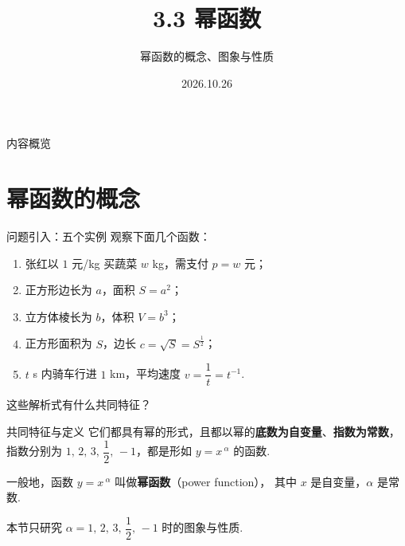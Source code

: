 \documentclass[aspectratio=169,13pt,t] {beamer}
\title[3.3幂函数]{3.3 幂函数}
\subtitle{幂函数的概念、图象与性质}
\author[好好学习，努力向上]{}
\institute{}
\date{2026.10.26}
\theoremstyle{definition}
\begin{document}
\begin{frame}{}
	\titlepage
\end{frame}

\begin{frame}{内容概览}
	\tableofcontents
\end{frame}

\section{幂函数的概念}

\begin{frame}{问题引入：五个实例}
	观察下面几个函数：
	\begin{enumerate}[(1)]
		\item 张红以 $1$ 元/kg 买蔬菜 $w$ kg，需支付 $p=w$ 元；
		\item 正方形边长为 $a$，面积 $S=a^{2}$；
		\item 立方体棱长为 $b$，体积 $V=b^{3}$；
		\item 正方形面积为 $S$，边长 $c=\sqrt{S}=S^{\frac12}$；
		\item $t$ s 内骑车行进 $1$ km，平均速度 $v=\dfrac{1}{t}=t^{-1}$.
	\end{enumerate}
	\vspace{-1em}
	\begin{summarybox}[观察]
		这些解析式有什么共同特征？
	\end{summarybox}
\end{frame}

\begin{frame}{共同特征与定义}
	它们都具有幂的形式，且都以幂的\textbf{底数为自变量}、\textbf{指数为常数}，
	指数分别为 $1,\,2,\,3,\,\dfrac12,\,-1$，都是形如 $y=x\,^{\alpha}$ 的函数.
	\vspace{-1em}
	\begin{summarybox}[幂函数的定义]
		一般地，函数 \textbf{$y=x\,^{\alpha}$} 叫做\textbf{幂函数}（power function），
		其中 $x$ 是自变量，$\alpha$ 是常数.
	\end{summarybox}
	\vspace{-1em}
	\begin{summarybox-answer}
		本节只研究 $\alpha=1,\,2,\,3,\,\dfrac12,\,-1$ 时的图象与性质.
	\end{summarybox-answer}
\end{frame}
\end{document}
